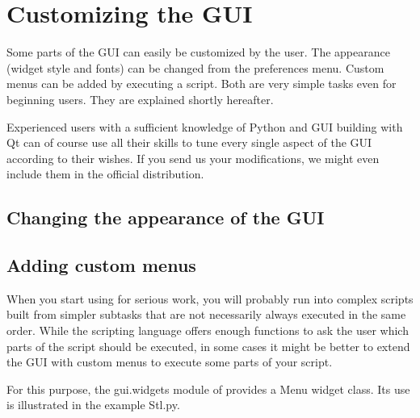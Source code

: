 \section{Customizing the GUI}
\label{sec:customize-gui}

Some parts of the \pyformex GUI can easily be customized by the user. 
The appearance (widget style and fonts) can be changed from the preferences menu. Custom menus can be added by executing a script. Both are very simple tasks even for beginning users. They are explained shortly hereafter.

Experienced users with a sufficient knowledge of Python and GUI building with Qt can of course use all their skills to tune every single aspect of the \pyformex GUI according to their wishes. If you send us your modifications, we might even include them in the official distribution.


\subsection{Changing the appearance of the GUI}
\label{sec:chang-appe-gui}


\subsection{Adding custom menus}
\label{sec:adding-custom-menus}

When you start using \pyformex for serious work, you will probably run into complex scripts built from simpler subtasks that are not necessarily always executed in the same order. While the \pyformex scripting language offers enough functions to ask the user which parts of the script should be executed, in some cases it might be better to extend the \pyformex GUI with custom menus to execute some parts of your script.

For this purpose, the gui.widgets module of \pyformex provides a Menu widget class. Its use is illustrated in the example Stl.py.

